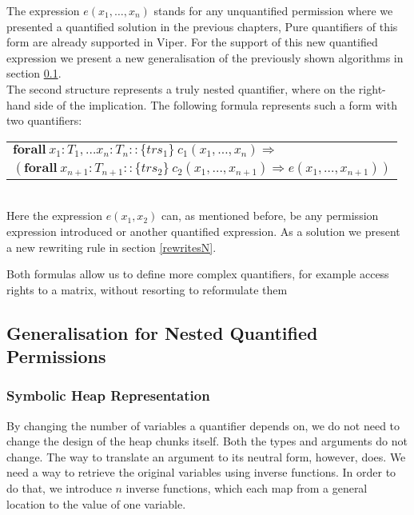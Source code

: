 \documentclass[12pt]{article}
\begin{document}
The expression \(e(x_1,  \dots, x_n)\) stands for any unquantified permission where we presented a quantified solution in the previous chapters, Pure quantifiers of this form are already supported in Viper. For the support of this new quantified expression we present a new generalisation of the previously shown algorithms in section \ref{generalN}.\\

The second structure represents a truly nested quantifier, where on the right-hand side of the implication. The following formula represents such a form with two quantifiers:\\

\begin{tabularx}{1\textwidth}{ X}
      \(\mathbf{forall \ }  x_1:T_1, \dots x_n:T_n ::  \{trs_1\}\  c_1(x_1, \dots, x_n) \Rightarrow \) \\
     \( ( \mathbf{forall \ } x_{n+1}:T_{n+1} :: \{trs_2\} \ c_2(x_1, \dots, x_{n+1}) \Rightarrow e(x_1, \dots, x_{n+1}))\)
\end{tabularx}\\

Here the expression \(e(x_1, x_2)\) can, as mentioned before, be any permission expression introduced or another quantified expression. As a solution we present a new rewriting rule in section \ref{rewritesN}.

Both formulas allow us to define more complex quantifiers, for example access rights to a matrix, without resorting to reformulate them 

\subsection{Generalisation for Nested Quantified Permissions}
\label{generalN}




\subsubsection{Symbolic Heap Representation} \label{shr}
By changing the number of variables a quantifier depends on, we do not need to change the design of the heap chunks itself. Both the types and arguments do not change. The way to translate an argument to its neutral form, however, does. We need a way to retrieve the original variables using inverse functions. In order to do that, we introduce \(n\) inverse functions, which each map from a general location to the value of one variable.
\end{document}
